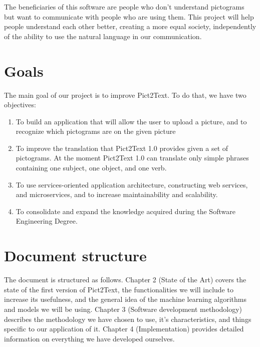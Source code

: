 The beneficiaries of this software are people who don't understand pictograms but want to communicate with people who are using them. This project will help people understand each other better, creating a more equal society, independently of the ability to use the natural language in our communication. 

\section{Goals}
The main goal of our project is to improve Pict2Text. To do that, we have two objectives:
\begin{enumerate}
\item To build an application that will allow the user to upload a picture, and to recognize which pictograms are on the given picture
\item To improve the translation that Pict2Text 1.0 provides given a set of pictograms. At the moment Pict2Text 1.0 can translate only simple phrases containing one subject, one object, and one verb.  
\item To use services-oriented application architecture, constructing web services, and microservices, and to increase maintainability and scalability.
\item To consolidate and expand the knowledge acquired during the Software Engineering Degree.
\end{enumerate}

\section{Document structure}
The document is structured as follows.
Chapter 2 (State of the Art) covers the state of the first version of Pict2Text, the functionalities we will include to increase its usefulness, and the general idea of the machine learning algorithms and models we will be using.
Chapter 3 (Software development methodology) describes the methodology we have chosen to use, it's characteristics, and things specific to our application of it. 
Chapter 4 (Implementation) provides detailed information on everything we have developed ourselves.








